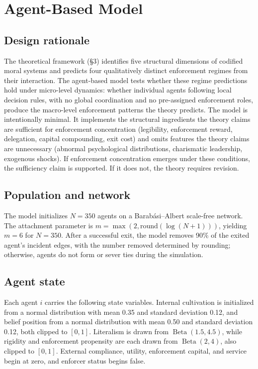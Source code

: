 \documentclass[12pt]{article}
\begin{document}
\section{Agent-Based Model}

\subsection{Design rationale}

The theoretical framework (\S3) identifies five structural dimensions of codified moral systems and predicts four qualitatively distinct enforcement regimes from their interaction. The agent-based model tests whether these regime predictions hold under micro-level dynamics: whether individual agents following local decision rules, with no global coordination and no pre-assigned enforcement roles, produce the macro-level enforcement patterns the theory predicts. The model is intentionally minimal. It implements the structural ingredients the theory claims are sufficient for enforcement concentration (legibility, enforcement reward, delegation, capital compounding, exit cost) and omits features the theory claims are unnecessary (abnormal psychological distributions, charismatic leadership, exogenous shocks). If enforcement concentration emerges under these conditions, the sufficiency claim is supported. If it does not, the theory requires revision.

\subsection{Population and network}

The model initializes $N = 350$ agents on a Barab\'asi--Albert scale-free network. The attachment parameter is $m = \max(2, \text{round}(\log(N + 1)))$, yielding $m = 6$ for $N = 350$. After a successful exit, the model removes 90\% of the exited agent's incident edges, with the number removed determined by rounding; otherwise, agents do not form or sever ties during the simulation.

\subsection{Agent state}

Each agent $i$ carries the following state variables. Internal cultivation is initialized from a normal distribution with mean 0.35 and standard deviation 0.12, and belief position from a normal distribution with mean 0.50 and standard deviation 0.12, both clipped to $[0,1]$. Literalism is drawn from $\operatorname{Beta}(1.5,4.5)$, while rigidity and enforcement propensity are each drawn from $\operatorname{Beta}(2,4)$, also clipped to $[0,1]$. External compliance, utility, enforcement capital, and service begin at zero, and enforcer status begins false.
\end{document}
